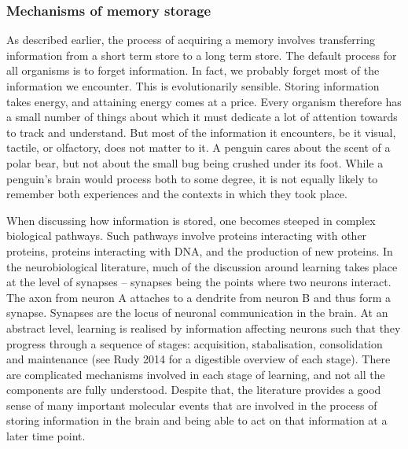 \documentclass[
  letterpaper,
  DIV=11,
  numbers=noendperiod,
  oneside]{scrartcl}
\begin{document}
\subsubsection{Mechanisms of memory storage}\label{sec-mechanisms}

As described earlier, the process of acquiring a memory involves
transferring information from a short term store to a long term store.
The default process for all organisms is to forget information. In fact,
we probably forget most of the information we encounter. This is
evolutionarily sensible. Storing information takes energy, and attaining
energy comes at a price. Every organism therefore has a small number of
things about which it must dedicate a lot of attention towards to track
and understand. But most of the information it encounters, be it visual,
tactile, or olfactory, does not matter to it. A penguin cares about the
scent of a polar bear, but not about the small bug being crushed under
its foot. While a penguin's brain would process both to some degree, it
is not equally likely to remember both experiences and the contexts in
which they took place.

When discussing how information is stored, one becomes steeped in
complex biological pathways. Such pathways involve proteins interacting
with other proteins, proteins interacting with DNA, and the production
of new proteins. In the neurobiological literature, much of the
discussion around learning takes place at the level of synapses --
synapses being the points where two neurons interact. The axon from
neuron A attaches to a dendrite from neuron B and thus form a synapse.
Synapses are the locus of neuronal communication in the brain. At an
abstract level, learning is realised by information affecting neurons
such that they progress through a sequence of stages: acquisition,
stabalisation, consolidation and maintenance (see Rudy 2014 for a
digestible overview of each stage). There are complicated mechanisms
involved in each stage of learning, and not all the components are fully
understood. Despite that, the literature provides a good sense of many
important molecular events that are involved in the process of storing
information in the brain and being able to act on that information at a
later time point.
\end{document}
